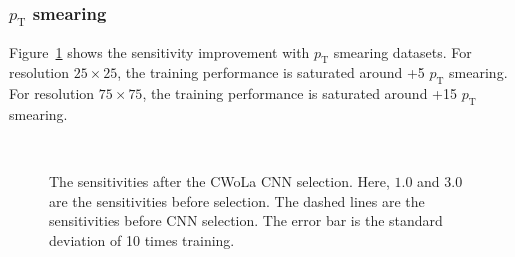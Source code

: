 \documentclass[12pt]{article}
\begin{document}
        \subsubsection{\texorpdfstring{$p_{\mathrm{T}}$}{pT} smearing}%
        \label{subs:pt_smearing}
            Figure~\ref{fig:sensitivity_improvement_origin_pt_aug_SB_1_3} shows the sensitivity improvement with $p_\text{T}$ smearing datasets. For resolution $25\times 25$, the training performance is saturated around +5 $p_{\text{T}}$ smearing. For resolution $75\times 75$, the training performance is saturated around +15 $p_{\text{T}}$ smearing.
            \begin{figure}[htpb]
                \centering
                 \\
                \caption{The sensitivities after the CWoLa CNN selection. Here, $1.0$ and $3.0$ are the sensitivities before selection. The dashed lines are the sensitivities before CNN selection. The error bar is the standard deviation of 10 times training.}
                \label{fig:sensitivity_improvement_origin_pt_aug_SB_1_3}
            \end{figure}
\end{document}
